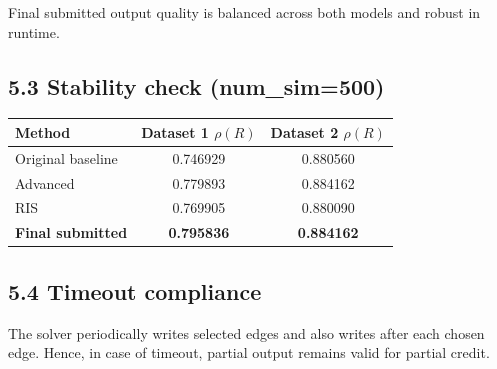 \documentclass[9pt,a4paper]{article}
\begin{document}
Final submitted output quality is balanced across both models and robust in
runtime.

\subsection*{5.3 Stability check (num\_sim=500)}
\begin{center}
\begin{tabular}{|l|c|c|}
\hline
Method & Dataset 1 $\rho(R)$ & Dataset 2 $\rho(R)$ \\
\hline
Original baseline & 0.746929 & 0.880560 \\
Advanced & 0.779893 & 0.884162 \\
RIS & 0.769905 & 0.880090 \\
\textbf{Final submitted} & \textbf{0.795836} & \textbf{0.884162} \\
\hline
\end{tabular}
\end{center}

\subsection*{5.4 Timeout compliance}
The solver periodically writes selected edges and also writes after each chosen
edge. Hence, in case of timeout, partial output remains valid for partial
credit.
\end{document}
